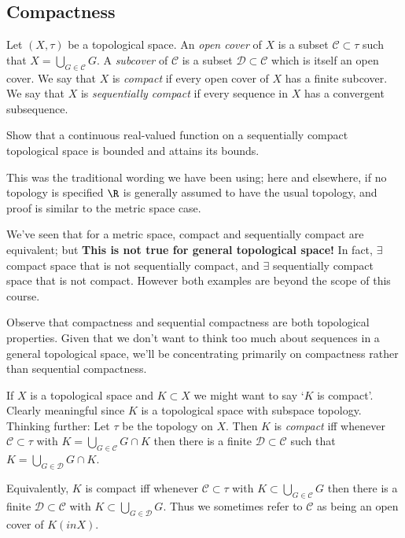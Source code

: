 \subsection{Compactness}
\vspace{3mm}
\begin{definition}
Let $(X,\tau)$ be a topological space. An \emph{open cover} of $X$ is a subset $\mathcal{C}\subset \tau$ such that $X = \bigcup_{G\in\mathcal{C}} G$. A \emph{subcover} of $\mathcal{C}$ is a subset $\mathcal{D}\subset \mathcal{C}$ which is itself an open cover. We say that $X$ is \emph{compact} if every open cover of $X$ has a finite subcover. We say that $X$ is \emph{sequentially compact} if every sequence in $X$ has a convergent subsequence.
\end{definition}
\begin{exercise}
Show that a continuous real-valued function on a sequentially compact topological space is bounded and attains its bounds.
\end{exercise}
\begin{remark}
This was the traditional wording we have been using; here and elsewhere, if no topology is specified $\R$ is generally assumed to have the usual topology, and proof is similar to the metric space case.

We've seen that for a metric space, compact and sequentially compact are equivalent; but \textbf{\color{red} This is not true for general topological space!} In fact, $\exists$ compact space that is not sequentially compact, and $\exists$ sequentially compact space that is not compact. However both examples are beyond the scope of this course.

Observe that compactness and sequential compactness are both topological properties. Given that we don't want to think too much about sequences in a general topological space, we'll be concentrating primarily on compactness rather than sequential compactness.
\end{remark}

\begin{definition}
    If $X$ is a topological space and $K\subset X$ we might want to say `$K$ is compact'. Clearly meaningful since $K$ is a topological space with subspace topology. Thinking further: Let $\tau$ be the topology on $X$. Then $K$ is \emph{compact} iff whenever $\mathcal{C}\subset \tau$ with $K = \bigcup_{G\in \mathcal{C}} G\cap K$ then there is a finite $\mathcal{D}\subset \mathcal{C}$ such that $K = \bigcup_{G\in \mathcal{D}} G\cap K$.
    
    Equivalently, $K$ is compact iff whenever $\mathcal{C}\subset \tau$ with $K\subset \bigcup_{G\in \mathcal{C}} G$ then there is a finite $\mathcal{D}\subset\mathcal{C}$ with $K\subset \bigcup_{G\in \mathcal{D}} G$. Thus we sometimes refer to $\mathcal{C}$ as being an open cover of $K (in X)$.
\end{definition}

